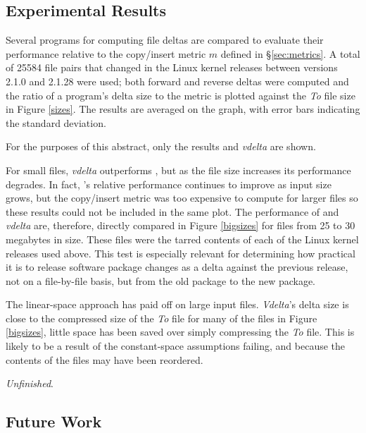 \documentclass{llncs}
\begin{document}
\subsection{Experimental Results}

Several programs for computing file deltas are compared to evaluate
their performance relative to the copy/insert metric $m$ defined in
\S\ref{sec:metrics}.  A total of 25584 file pairs that changed
in the Linux kernel releases between versions 2.1.0 and 2.1.28 were
used; both forward and reverse deltas were computed and the ratio of a
program's delta size to the metric is plotted against the \emph{To}
file size in Figure \ref{sizes}.  The results are averaged on the
graph, with error bars indicating the standard deviation.

For the purposes of this abstract, only the results \xd {} and
\emph{vdelta} are shown.


For small files, \emph{vdelta} outperforms \xd, but as the file size
increases its performance degrades.  In fact, \xd's relative
performance continues to improve as input size grows, but the
copy/insert metric was too expensive to compute for larger files so
these results could not be included in the same plot.  The performance
of \xd {}  and \emph{vdelta} are, therefore, directly compared in Figure
\ref{bigsizes} for files from 25 to 30 megabytes in size.  These
files were the tarred contents of each of the Linux kernel releases
used above.  This test is especially relevant for determining how
practical it is to release software package changes as a delta against
the previous release, not on a file-by-file basis, but from the old
package to the new package.


The linear-space approach has paid off on large input files.
\emph{Vdelta}'s delta size is close to the compressed size of the
\emph{To} file for many of the files in Figure \ref{bigsizes}, little
space has been saved over simply compressing the \emph{To} file.  This
is likely to be a result of the constant-space assumptions failing,
and because the contents of the files may have been reordered.

\emph{Unfinished}.

\subsection{Future Work}
\end{document}
